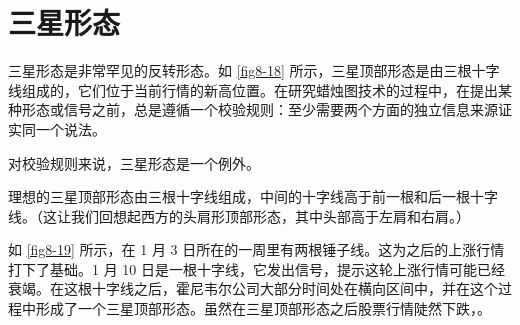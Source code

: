 \section{三星形态}
三星形态是非常罕见的反转形态。如 \autoref{fig8-18} 所示，三星顶部形态是由三根十字线组成的，它们位于当前行情的新高位置。在研究蜡烛图技术的过程中，在提出某种形态或信号之前，总是遵循一个校验规则：至少需要两个方面的独立信息来源证实同一个说法。

对校验规则来说，三星形态是一个例外。

理想的三星顶部形态由三根十字线组成，中间的十字线高于前一根和后一根十字线。（这让我们回想起西方的头肩形顶部形态，其中头部高于左肩和右肩。）

如 \autoref{fig8-19} 所示，在 1 月 3 日所在的一周里有两根锤子线。这为之后的上涨行情打下了基础。1 月 10 日是一根十字线，它发出信号，提示这轮上涨行情可能已经衰竭。在这根十字线之后，霍尼韦尔公司大部分时间处在横向区间中，并在这个过程中形成了一个三星顶部形态。虽然在三星顶部形态之后股票行情陡然下跌，。
